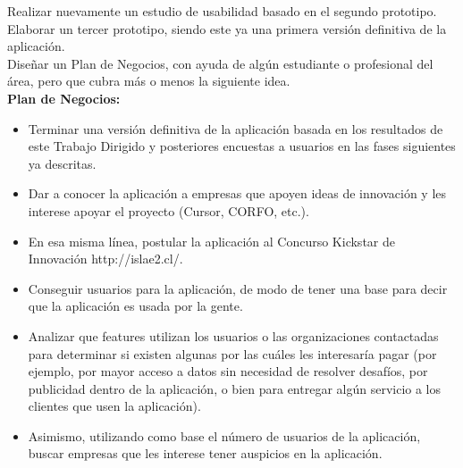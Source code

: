 \documentclass[10pt,letterpaper]{article}
\begin{document}
Realizar nuevamente un estudio de usabilidad basado en el segundo prototipo.\\

Elaborar un tercer prototipo, siendo este ya una primera versión definitiva de la aplicación.\\

Diseñar un Plan de Negocios, con ayuda de algún estudiante o profesional del área, pero que cubra más o menos la siguiente idea.\\

\textbf{Plan de Negocios:}\\

\begin{itemize}
 \item Terminar una versión definitiva de la aplicación basada en los resultados de este Trabajo Dirigido y posteriores encuestas a usuarios en las fases siguientes ya descritas.

  \item Dar a conocer la aplicación a empresas que apoyen ideas de innovación y les interese apoyar el proyecto (Cursor, CORFO, etc.).

 \item En esa misma línea, postular la aplicación al Concurso Kickstar de Innovación http://islae2.cl/.

 \item Conseguir usuarios para la aplicación, de modo de tener una base para decir que la aplicación es usada por la gente.

 \item Analizar que features utilizan los usuarios o las organizaciones contactadas para determinar si existen algunas por las cuáles les interesaría pagar (por ejemplo, por mayor acceso a datos sin necesidad de resolver desafíos, por publicidad dentro de la aplicación, o bien para entregar algún servicio a los clientes que usen la aplicación).

 \item Asimismo, utilizando como base el número de usuarios de la aplicación, buscar empresas que les interese tener auspicios en la aplicación.

\end{itemize}
\end{document}
